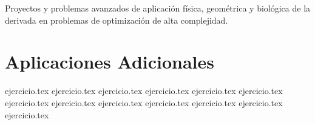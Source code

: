 
Proyectos y problemas avanzados de aplicación física, geométrica y biológica de la derivada en problemas de optimización de alta complejidad.

\section*{Aplicaciones Adicionales}

\begin{enumerate}
    {ejercicio.tex}
    {ejercicio.tex}
    {ejercicio.tex}
    {ejercicio.tex}
    {ejercicio.tex}
    {ejercicio.tex}
    {ejercicio.tex}
    {ejercicio.tex}
    {ejercicio.tex}
    {ejercicio.tex}
    {ejercicio.tex}
    {ejercicio.tex}
    {ejercicio.tex}
\end{enumerate}
